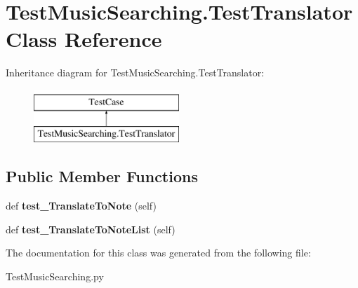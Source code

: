 \hypertarget{class_test_music_searching_1_1_test_translator}{}\section{Test\+Music\+Searching.\+Test\+Translator Class Reference}
\label{class_test_music_searching_1_1_test_translator}
Inheritance diagram for Test\+Music\+Searching.\+Test\+Translator\+:\begin{figure}[H]
\begin{center}
\leavevmode
\includegraphics[height=2.000000cm]{class_test_music_searching_1_1_test_translator}
\end{center}
\end{figure}
\subsection*{Public Member Functions}
\begin{DoxyCompactItemize}
\item 
\mbox{\label{class_test_music_searching_1_1_test_translator_a9fae337f115752ac5c8ec0f1cd4f931f}} 
def {\bfseries test\+\_\+\+Translate\+To\+Note} (self)
\item 
\mbox{\label{class_test_music_searching_1_1_test_translator_a5ef1be4dfc450fda469027b912bbfa92}} 
def {\bfseries test\+\_\+\+Translate\+To\+Note\+List} (self)
\end{DoxyCompactItemize}


The documentation for this class was generated from the following file\+:\begin{DoxyCompactItemize}
\item 
Test\+Music\+Searching.\+py\end{DoxyCompactItemize}
